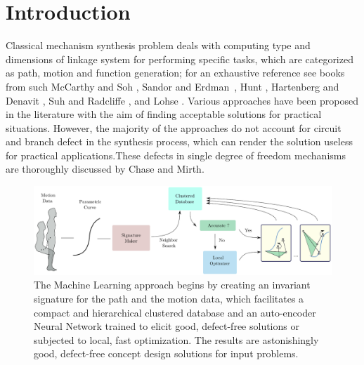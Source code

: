 \documentclass[twocolumn,10pt]{asme2ej}
\begin{document}
\section{Introduction}
Classical mechanism synthesis problem deals with computing type and dimensions of linkage system for performing specific tasks, which are categorized as path, motion and function generation; for an exhaustive reference see  books from such McCarthy and Soh \cite{sohmccarthy}, Sandor and Erdman~\cite{Sandor}, Hunt \cite{Hunt78}, Hartenberg and Denavit \cite{Hartenberg},  Suh and Radcliffe \cite{Suh78}, and Lohse \cite{lohse2013}.
Various approaches have been proposed in the literature with the aim of finding acceptable solutions for practical situations.
However, the majority of the approaches do not account for circuit and branch defect in the synthesis process, which can render the solution useless for practical applications.These defects in single degree of freedom mechanisms are thoroughly discussed by Chase and Mirth\cite{chasemirth}.

\begin{figure}
\centering
\includegraphics[width=\textwidth]{figure/overall_approach.eps}
  \caption{The Machine Learning approach begins by creating an invariant signature for the path and the motion data, which facilitates a compact and hierarchical clustered database and an auto-encoder Neural Network trained to elicit good, defect-free solutions or subjected to local, fast optimization. The results are astonishingly good, defect-free concept design solutions for input problems.}
\label{overallMethod}
\end{figure}
\end{document}
